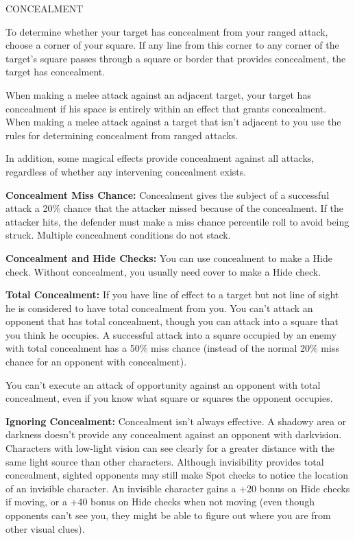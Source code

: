 \documentclass{article}
\begin{document}
\vspace{12pt}
CONCEALMENT

To determine whether your target has concealment from your ranged attack, choose 
a corner of your square. If any line from this corner to any corner of the target's 
square passes through a square or border that provides concealment, the target 
has concealment.

When making a melee attack against an adjacent target, your target has concealment 
if his space is entirely within an effect that grants concealment. When making 
a melee attack against a target that isn't adjacent to you use the rules for determining 
concealment from ranged attacks.

In addition, some magical effects provide concealment against all attacks, regardless 
of whether any intervening concealment exists.

\textbf{Concealment Miss Chance: }Concealment gives the subject of a successful 
attack a 20\% chance that the attacker missed because of the concealment. If the 
attacker hits, the defender must make a miss chance percentile roll to avoid being 
struck. Multiple concealment conditions do not stack.

\textbf{Concealment and Hide Checks:} You can use concealment to make a Hide check. 
Without concealment, you usually need cover to make a Hide check.

\textbf{Total Concealment:} If you have line of effect to a target but not line 
of sight he is considered to have total concealment from you. You can't attack 
an opponent that has total concealment, though you can attack into a square that 
you think he occupies. A successful attack into a square occupied by an enemy with 
total concealment has a 50\% miss chance (instead of the normal 20\% miss chance 
for an opponent with concealment).

You can't execute an attack of opportunity against an opponent with total concealment, 
even if you know what square or squares the opponent occupies.

\textbf{Ignoring Concealment:} Concealment isn't always effective. A shadowy area 
or darkness doesn't provide any concealment against an opponent with darkvision. 
Characters with low-light vision can see clearly for a greater distance with the 
same light source than other characters. Although invisibility provides total concealment, 
sighted opponents may still make Spot checks to notice the location of an invisible 
character. An invisible character gains a +20 bonus on Hide checks if moving, or 
a +40 bonus on Hide checks when not moving (even though opponents can't see you, 
they might be able to figure out where you are from other visual clues).
\end{document}
